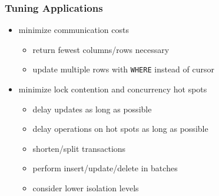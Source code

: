 \documentclass[]{article}
\theoremstyle{definition}
\begin{document}
	\subsubsection{Tuning Applications}
	\begin{itemize}
		\item minimize communication costs
			\begin{itemize}
				\item return fewest columns/rows necessary
				\item update multiple rows with \lstinline|WHERE| instead of cursor
			\end{itemize}
		\item minimize lock contention and concurrency hot spots
			\begin{itemize}
				\item delay updates as long as possible
				\item delay operations on hot spots as long as possible
				\item shorten/split transactions
				\item perform insert/update/delete in batches
				\item consider lower isolation levels
			\end{itemize}
	\end{itemize}
\end{document}
